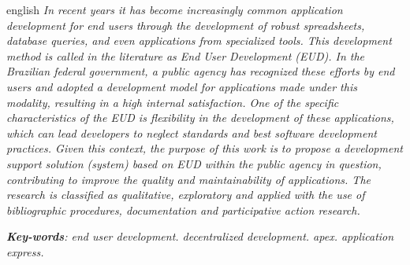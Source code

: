 \begin{resumo}[Abstract]
 \begin{otherlanguage*}{english}
   \textit{In recent years it has become increasingly common application development for end users through the development of robust spreadsheets, database queries, and even applications from specialized tools. This development method is called in the literature as End User Development (EUD). In the Brazilian federal government, a public agency has recognized these efforts by end users and adopted a development model for applications made under this modality, resulting in a high internal satisfaction. One of the specific characteristics of the EUD is flexibility in the development of these applications, which can lead developers to neglect standards and best software development practices. Given this context, the purpose of this work is to propose a development support solution (system) based on EUD within the public agency in question, contributing to improve the quality and maintainability of applications. The research is classified as qualitative, exploratory and applied with the use of bibliographic procedures, documentation and participative action research.}

   \vspace{\onelineskip}
 
   \noindent 
   \textit{\textbf{Key-words}: end user development. decentralized development. apex. application express.}
 \end{otherlanguage*}
\end{resumo}